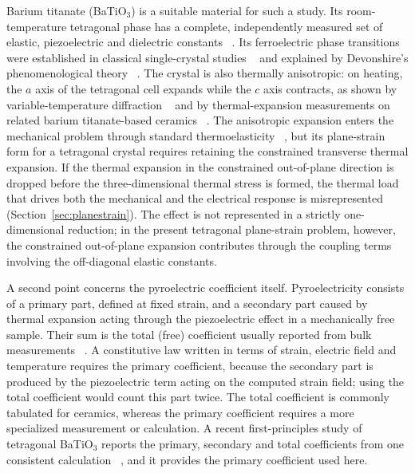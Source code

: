 \documentclass[pdflatex,sn-mathphys-num]{sn-jnl}
\begin{document}
Barium titanate (BaTiO$_3$) is a suitable material for such a study. Its
room-temperature tetragonal phase has a complete, independently measured set of
elastic, piezoelectric and dielectric constants ~\cite{Zgonik1994,Berlincourt1958}. Its
ferroelectric phase transitions were established in classical single-crystal studies
~\cite{Merz1949,KayVousden1949} and explained by Devonshire's phenomenological theory
~\cite{Devonshire1949,Devonshire1951}. The crystal is also thermally anisotropic: on
heating, the $a$ axis of the tetragonal cell expands while the $c$ axis contracts, as
shown by variable-temperature diffraction ~\cite{Nakatani2016} and by thermal-expansion
measurements on related barium titanate-based ceramics ~\cite{Han2015,He2015Thermal}.
The anisotropic expansion enters the mechanical problem through standard
thermoelasticity ~\cite{BoleyWeiner1997,Nowacki1975}, but its plane-strain form for a
tetragonal crystal requires retaining the constrained transverse thermal expansion.
If the thermal expansion in the constrained out-of-plane direction is dropped before
the three-dimensional thermal stress is formed, the thermal load that drives both the
mechanical and the electrical response is misrepresented (Section~\ref{sec:planestrain}).
The effect is not represented in a strictly one-dimensional reduction; in the present
tetragonal plane-strain problem, however, the constrained out-of-plane expansion
contributes through the coupling terms involving the off-diagonal elastic constants.

A second point concerns the pyroelectric coefficient itself. Pyroelectricity consists
of a primary part, defined at fixed strain, and a secondary part caused by thermal
expansion acting through the piezoelectric effect in a mechanically free sample. Their
sum is the total (free) coefficient usually reported from bulk measurements
~\cite{Lang2005Pyro,Tagantsev1991,Lubomirsky2012}. A constitutive law written in terms
of strain, electric field and temperature requires the primary coefficient, because the
secondary part is produced by the piezoelectric term acting on the computed strain
field; using the total coefficient would count this part twice. The total coefficient
is commonly tabulated for ceramics, whereas the primary coefficient requires a more
specialized measurement or calculation. A recent first-principles study of tetragonal
BaTiO$_3$ reports the primary, secondary and total coefficients from one consistent
calculation ~\cite{EklundKarttunen2023}, and it provides the primary coefficient used here.
\end{document}
